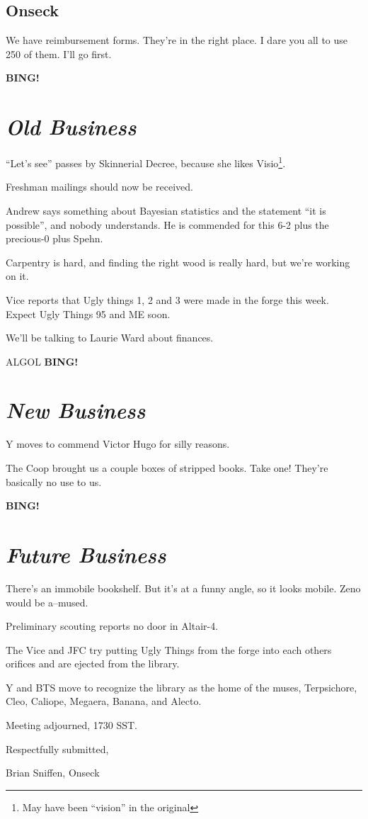 \documentclass[10pt]{article}
\newcommand{\bing}{{\bf BING!} }
\newcommand{\goto}[1]{\bing \vskip 12pt \section*{{\em{#1}}}}
\newcommand{\ps}{ plus Spehn\xspace}
\begin{document}
\subsection*{Onseck}
We have reimbursement forms.  They're in the right place.  I dare you
all to use 250 of them.  I'll go first.

\goto{Old Business}
``Let's see'' passes by Skinnerial Decree, because she likes
Visio\footnote{May have been ``vision'' in the original}.

Freshman mailings should now be received.

Andrew says something about Bayesian statistics and the statement ``it
is possible'', and nobody understands.  He is commended for this 6-2 plus the precious-0\ps.

Carpentry is hard, and finding the right wood is really hard, but
we're working on it.

Vice reports that Ugly things 1, 2 and 3 were made in the forge this
week.  Expect Ugly Things 95 and ME soon.

We'll be talking to Laurie Ward about finances.

ALGOL
\goto{New Business}

Y moves to commend Victor Hugo for silly reasons.

The Coop brought us a couple boxes of stripped books.  Take one!
They're basically no use to us.

\goto{Future Business}

There's an immobile bookshelf.  But it's at a funny angle, so it looks
mobile.  Zeno would be a--mused.

Preliminary scouting reports no door in Altair-4.

The Vice and JFC try putting Ugly Things from the forge into each
others orifices and are ejected from the library.

Y and BTS move to recognize the library as the home of the muses,
Terpsichore, Cleo, Caliope, Megaera, Banana, and Alecto.

\vspace{12pt}

\noindent
Meeting adjourned, 1730 SST.

\vspace{18pt}

\centerline{Respectfully submitted,}
\centerline{Brian Sniffen, Onseck}
\end{document}
